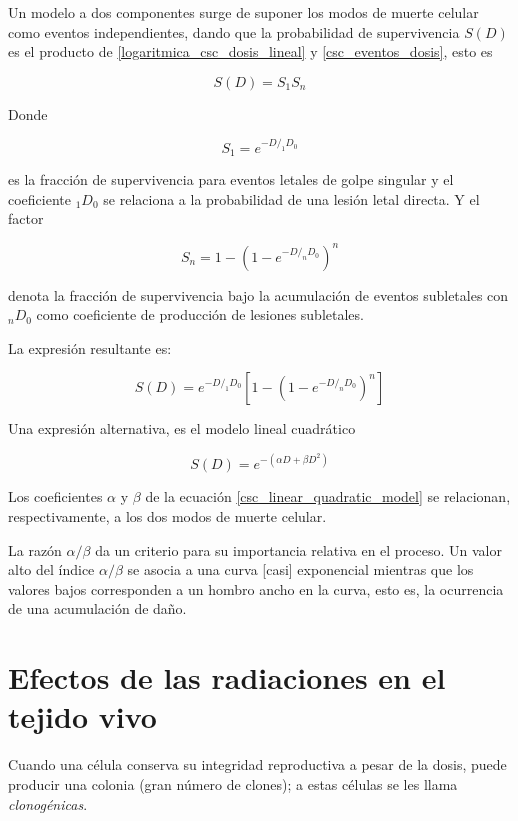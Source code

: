 \documentclass[12pt,letterpaper, oneside]{book}
\begin{document}
			Un modelo a dos componentes surge de suponer los modos de muerte celular como eventos independientes, dando que la probabilidad de supervivencia $S(D)$ es el producto de \ref{logaritmica_csc_dosis_lineal} y \ref{csc_eventos_dosis}\cite{Tubiana.1990}, esto es
			
			$$S(D)=S_1S_n$$
			
			Donde 
			
			$$S_1=e^{-D/_1D_0}$$
			
			es la fracción de supervivencia para eventos letales de golpe singular y el coeficiente $_1D_0$ se relaciona a la probabilidad de una lesión letal directa. Y el factor
			
			$$S_n=1-(1-e^{-D/_nD_0})^n$$
			
			denota la fracción de supervivencia bajo la acumulación de eventos subletales con $_nD_0$ como coeficiente de producción de lesiones subletales. 
			
			La expresión resultante es:
			
			\begin{equation}
				S(D)=e^{-D/_1D_0}\left[1-(1-e^{-D/_nD_0})^n\right]\label{csc_onehitlethal_nsublethal}
			\end{equation}
			
			Una expresión alternativa, es el modelo lineal cuadrático
			
			\begin{equation}
				S(D)=e^{-(\alpha D + \beta D^2)}\label{csc_linear_quadratic_model}
			\end{equation}
			
			Los coeficientes $\alpha$ y $\beta$ de la ecuación \ref{csc_linear_quadratic_model} se relacionan, respectivamente, a los dos modos de muerte celular. 
			
			La razón $\alpha/\beta$ da un criterio para su importancia relativa en el proceso\cite{Tubiana.1990}. Un valor alto del índice $\alpha/\beta$ se asocia a una curva [casi] exponencial mientras que los valores bajos corresponden a un hombro ancho en la curva\cite{Tubiana.1990}, esto es, la ocurrencia de una acumulación de daño.
						
		\section{Efectos de las radiaciones en el tejido vivo}
		Cuando una célula conserva su integridad reproductiva a pesar de la dosis, puede producir una colonia (gran número de clones); a estas células se les llama \textit{clonogénicas}\cite{Hall.2000}.
		
\end{document}
